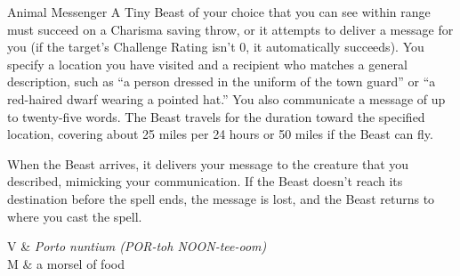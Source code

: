 \begin{Spell}[
  tags=Ritual,
  level=2nd,
  time=1 Action,
  range=30 ft,
  components={V, S, M},
  duration=24 Hours,
  school=Enchantment,
  attack=CHA Save,
  effect=Communication
]{Animal Messenger}
A Tiny Beast of your choice that you can see within range must succeed on a Charisma saving throw, or it attempts to deliver a message for you (if the target's Challenge Rating isn't 0, it automatically succeeds). You specify a location you have visited and a recipient who matches a general description, such as ``a person dressed in the uniform of the town guard'' or ``a red-haired dwarf wearing a pointed hat.'' You also communicate a message of up to twenty-five words. The Beast travels for the duration toward the specified location, covering about 25 miles per 24 hours or 50 miles if the Beast can fly.

When the Beast arrives, it delivers your message to the creature that you described, mimicking your communication. If the Beast doesn't reach its destination before the spell ends, the message is lost, and the Beast returns to where you cast the spell.

\begin{components}
V & \textit{Porto nuntium (POR-toh NOON-tee-oom)} \\
M & a morsel of food
\end{components}
\end{Spell}


